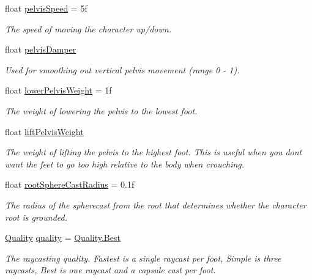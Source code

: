 \begin{DoxyCompactItemize}
float \mbox{\hyperlink{class_root_motion_1_1_final_i_k_1_1_grounding_ad66fd5981e44426789a113d6c4831c63}{pelvis\+Speed}} = 5f
\begin{DoxyCompactList}\small\item\em The speed of moving the character up/down. \end{DoxyCompactList}\item 
float \mbox{\hyperlink{class_root_motion_1_1_final_i_k_1_1_grounding_a737d82f1919f156b8e9a06a291cdc9f6}{pelvis\+Damper}}
\begin{DoxyCompactList}\small\item\em Used for smoothing out vertical pelvis movement (range 0 -\/ 1). \end{DoxyCompactList}\item 
float \mbox{\hyperlink{class_root_motion_1_1_final_i_k_1_1_grounding_aea1479e0ac46ce074118a1e06ff7de60}{lower\+Pelvis\+Weight}} = 1f
\begin{DoxyCompactList}\small\item\em The weight of lowering the pelvis to the lowest foot. \end{DoxyCompactList}\item 
float \mbox{\hyperlink{class_root_motion_1_1_final_i_k_1_1_grounding_a5c9d00b79226282751b4f030b730b82a}{lift\+Pelvis\+Weight}}
\begin{DoxyCompactList}\small\item\em The weight of lifting the pelvis to the highest foot. This is useful when you don\textquotesingle{}t want the feet to go too high relative to the body when crouching. \end{DoxyCompactList}\item 
float \mbox{\hyperlink{class_root_motion_1_1_final_i_k_1_1_grounding_a4696cd551b52d7f5e6fba6cdd32f1b39}{root\+Sphere\+Cast\+Radius}} = 0.\+1f
\begin{DoxyCompactList}\small\item\em The radius of the spherecast from the root that determines whether the character root is grounded. \end{DoxyCompactList}\item 
\mbox{\hyperlink{class_root_motion_1_1_final_i_k_1_1_grounding_ad216a50d7c69e8851cba32c52db05bf0}{Quality}} \mbox{\hyperlink{class_root_motion_1_1_final_i_k_1_1_grounding_a75707b0c143f57823b309cc0af694d48}{quality}} = \mbox{\hyperlink{class_root_motion_1_1_final_i_k_1_1_grounding_ad216a50d7c69e8851cba32c52db05bf0a68ef004de6166492c1d668eb8efe09bd}{Quality.\+Best}}
\begin{DoxyCompactList}\small\item\em The raycasting quality. Fastest is a single raycast per foot, Simple is three raycasts, Best is one raycast and a capsule cast per foot. \end{DoxyCompactList}\end{DoxyCompactItemize}
